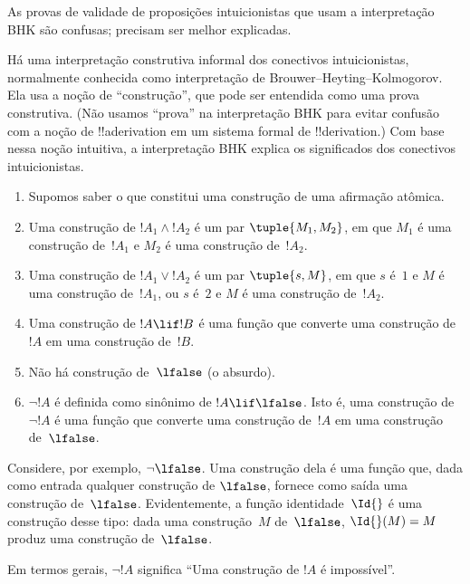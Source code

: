 \documentclass[../../../include/open-logic-section]{subfiles}
\begin{document}


\begin{editorial}
  As provas de validade de proposições intuicionistas que usam a
  interpretação BHK são confusas; precisam ser melhor explicadas.
\end{editorial}

Há uma interpretação construtiva informal dos conectivos
intuicionistas, normalmente conhecida como interpretação de
Brouwer--Heyting--Kolmogorov. Ela usa a noção de ``construção'', que
pode ser entendida como uma prova construtiva. (Não usamos ``prova'' na
interpretação BHK para evitar confusão com a noção de !!a{derivation}
em um sistema formal de !!{derivation}.) Com base nessa noção intuitiva,
a interpretação BHK explica os significados dos conectivos
intuicionistas.

\begin{enumerate}
\item Supomos saber o que constitui uma construção de uma afirmação
  atômica.
\item Uma construção de $!A_1 \land !A_2$ é um par $\tuple{M_1, M_2}$,
  em que $M_1$ é uma construção de~$!A_1$ e $M_2$ é uma construção
  de~$!A_2$.
\item Uma construção de $!A_1 \lor !A_2$ é um par $\tuple{s, M}$,
  em que $s$ é~$1$ e $M$ é uma construção de~$!A_1$, ou $s$ é~$2$
  e $M$ é uma construção de~$!A_2$.
\item Uma construção de $!A \lif !B$ é uma função que converte uma
  construção de~$!A$ em uma construção de~$!B$.
\item Não há construção de~$\lfalse$ (o absurdo).
\item $\lnot !A$ é definida como sinônimo de $!A \lif \lfalse$. Isto é,
  uma construção de $\lnot !A$ é uma função que converte uma construção
  de~$!A$ em uma construção de~$\lfalse$.
\end{enumerate}

\begin{ex}
Considere, por exemplo, $\lnot \lfalse$. Uma construção dela é uma
função que, dada como entrada qualquer construção de $\lfalse$,
fornece como saída uma construção de~$\lfalse$. Evidentemente, a
função identidade~$\Id{}$ é uma construção desse tipo: dada uma
construção~$M$ de~$\lfalse$, $\Id{}(M) = M$ produz uma construção
de~$\lfalse$.
\end{ex}

Em termos gerais, $\lnot !A$ significa ``Uma construção de $!A$ é impossível''.
\end{document}
